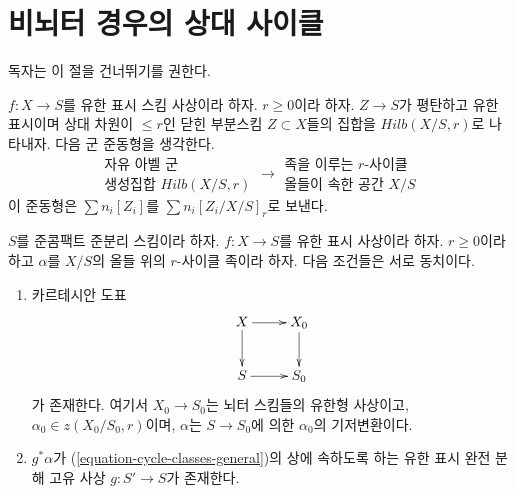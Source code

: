 \section{비뇌터 경우의 상대 사이클}
\label{section-non-noetherian}

\noindent
독자는 이 절을 건너뛰기를 권한다.

\medskip\noindent
$f : X \to S$를 유한 표시 스킴 사상이라 하자. $r \geq 0$이라 하자.
$Z \to S$가 평탄하고 유한 표시이며 상대 차원이 $\leq r$인 닫힌
부분스킴 $Z \subset X$들의 집합을 $Hilb(X/S, r)$로 나타내자. 다음
군 준동형을 생각한다.
\begin{equation}
\label{equation-cycle-classes-general}
\begin{matrix}
\text{자유 아벨 군} \\
\text{생성집합 }Hilb(X/S, r)
\end{matrix}
\longrightarrow
\begin{matrix}
\text{족을 이루는 }r\text{-사이클}\\
\text{올들이 속한 공간 }X/S
\end{matrix}
\end{equation}
이 준동형은 $\sum n_i[Z_i]$를 $\sum n_i[Z_i/X/S]_r$로 보낸다.

\begin{lemma}
\label{lemma-relative-r-cycle-general}
$S$를 준콤팩트 준분리 스킴이라 하자. $f : X \to S$를 유한 표시
사상이라 하자. $r \geq 0$이라 하고 $\alpha$를 $X/S$의 올들 위의
$r$-사이클 족이라 하자. 다음 조건들은 서로 동치이다.
\begin{enumerate}
\item 카르테시안 도표
$$
\xymatrix{
X \ar[r] \ar[d] & X_0 \ar[d] \\
S \ar[r] & S_0
}
$$
가 존재한다. 여기서 $X_0 \to S_0$는 뇌터 스킴들의 유한형 사상이고,
$\alpha_0 \in z(X_0/S_0, r)$이며, $\alpha$는 $S \to S_0$에 의한
$\alpha_0$의 기저변환이다.
\item $g^*\alpha$가 (\ref{equation-cycle-classes-general})의 상에
속하도록 하는 유한 표시 완전 분해 고유 사상 $g : S' \to S$가
존재한다.
\end{enumerate}
\end{lemma}

